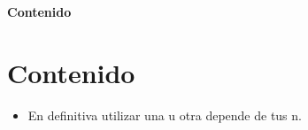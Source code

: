 
\begin{Large}
\begin{center}
\textbf{Contenido} \\
\end{center}
\end{Large}

\section{Contenido} 


\begin{itemize}
	\begin{center}
	\texttt{[image: ./Imagenes/imagen2]} 
	\end{center}

	\item En definitiva utilizar una u otra depende de tus n.



\end{itemize} 